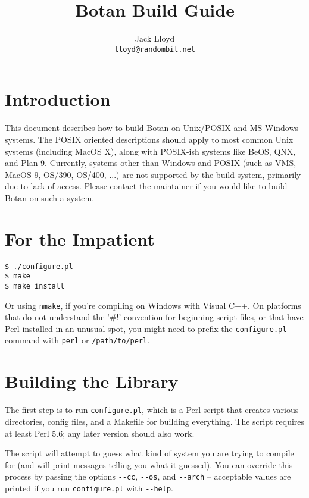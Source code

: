 \documentclass{article}
\title{\textbf{Botan Build Guide}}
\author{Jack Lloyd \\
        \texttt{lloyd@randombit.net}}
\date{}
\newcommand{\filename}[1]{\texttt{#1}}
\begin{document}
\maketitle

\tableofcontents

\parskip=5pt
\pagebreak

\section{Introduction}

This document describes how to build Botan on Unix/POSIX and MS
Windows systems. The POSIX oriented descriptions should apply to most
common Unix systems (including MacOS X), along with POSIX-ish systems
like BeOS, QNX, and Plan 9. Currently, systems other than Windows and
POSIX (such as VMS, MacOS 9, OS/390, OS/400, ...) are not supported by
the build system, primarily due to lack of access. Please contact the
maintainer if you would like to build Botan on such a system.

\section{For the Impatient}

\begin{verbatim}
$ ./configure.pl
$ make
$ make install
\end{verbatim}

Or using \verb|nmake|, if you're compiling on Windows with Visual
C++. On platforms that do not understand the '\#!' convention for
beginning script files, or that have Perl installed in an unusual
spot, you might need to prefix the \texttt{configure.pl} command with
\texttt{perl} or \texttt{/path/to/perl}.

\section{Building the Library}

The first step is to run \filename{configure.pl}, which is a Perl
script that creates various directories, config files, and a Makefile
for building everything. The script requires at least Perl 5.6; any
later version should also work.

The script will attempt to guess what kind of system you are trying
to compile for (and will print messages telling you what it guessed).
You can override this process by passing the options \verb|--cc|,
\verb|--os|, and \verb|--arch| -- acceptable values are printed if
you run \verb|configure.pl| with \verb|--help|.
\end{document}
